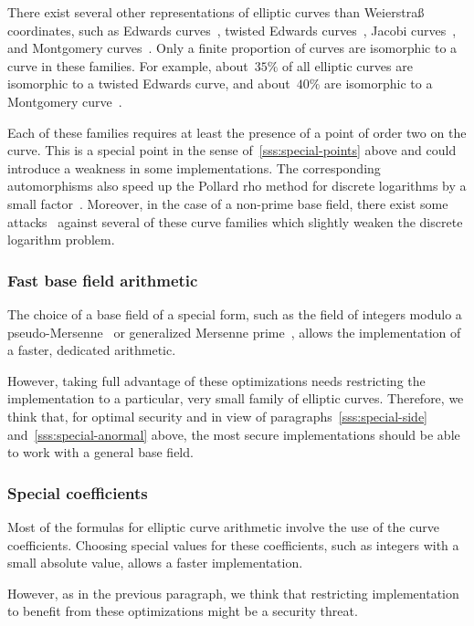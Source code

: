 \documentclass[twocolumn,letterpaper,10pt]{article}
\begin{document}
There exist several other representations of elliptic curves
than Weierstraß coordinates, such as
Edwards curves~\cite{ams2007edwards},
twisted Edwards curves~\cite{africa2008bbjl},
Jacobi curves~\cite{aaaaec2003bj},
and Montgomery curves~\cite{mc1987montgomery}.
Only a finite proportion of curves are isomorphic
to a curve in these families.
For example, about~$35\%$ of all elliptic curves
are isomorphic to a twisted Edwards curve,
and about~$40\%$ are isomorphic to a Montgomery curve~\cite{sac2011plut}.

Each of these families requires at least
the presence of a point of order two on the curve.
This is a special point in the sense of~\ref{sss:special-points} above
and could introduce a weakness in some implementations.
The corresponding automorphisms also speed up the Pollard rho
method for discrete logarithms by a small factor~\cite{moc2000glv}.
Moreover, in the case of a non-prime base field,
there exist some attacks~\cite{jc2014fghr}
against several of these curve families
which slightly weaken the discrete logarithm problem.

\subsubsection{Fast base field arithmetic}
\label{sss:special-fast}

The choice of a base field of a special form,
such as the field of integers modulo
a pseudo-Mersenne~\cite{pkc2006bernstein}
or generalized Mersenne prime~\cite{nist2000fips186-2},
allows the implementation of a faster, dedicated arithmetic.

However, taking full advantage of these optimizations
needs restricting the implementation to a particular, very small
family of elliptic curves.
Therefore, we think that, for optimal security and in view of
paragraphs~\ref{sss:special-side} and~\ref{sss:special-anormal} above,
the most secure implementations should be able to work with
a general base field.

\subsubsection{Special coefficients}

Most of the formulas for elliptic curve arithmetic
involve the use of the curve coefficients.
Choosing special values for these coefficients,
such as integers with a small absolute value,
allows a faster implementation.

However, as in the previous paragraph, we think that
restricting implementation to benefit from these optimizations
might be a security threat.
\end{document}

